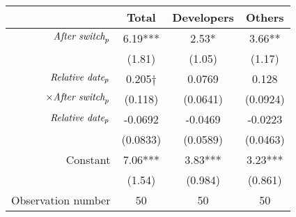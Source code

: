 \begin{tabular}{|r|c|c|c|}
\hline
&  Total & Developers & Others \\
\hline
$\mbox{\emph{After switch}}_p$ & 6.19*** & 2.53* & 3.66** \\
 & (1.81) & (1.05) & (1.17) \\
\hline
$\mbox{\emph{Relative date}}_p$ & 0.205$\dagger$ & 0.0769 & 0.128 \\
$\times \mbox{\emph{After switch}}_p$ & (0.118) & (0.0641) & (0.0924) \\
\hline
$\mbox{\emph{Relative date}}_p$ & -0.0692 & -0.0469 & -0.0223 \\
 & (0.0833) & (0.0589) & (0.0463) \\
\hline
Constant & 7.06*** & 3.83*** & 3.23*** \\
 & (1.54) & (0.984) & (0.861) \\
\hline
Observation number & 50 & 50 & 50 \\
\hline
\end{tabular}